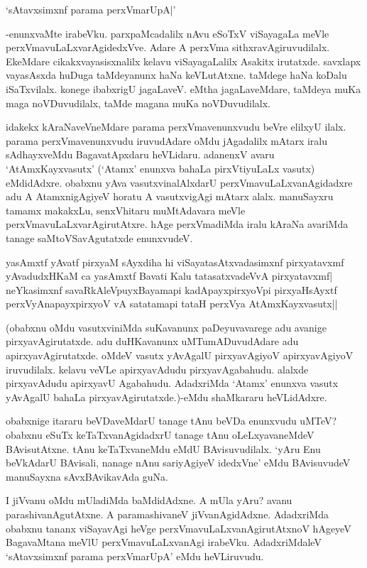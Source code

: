 \begin{shloka}
`sAtavxsimxnf parama perxVmarUpA|'
\end{shloka}

-enunxvaMte irabeVku. parxpaMcadalilx nAvu eSoTxV viSayagaLa meVle perxVmavuLaLxvarAgidedxVve. Adare A perxVma sithxravAgiruvudilalx. EkeMdare cikakxvayasisxnalilx kelavu viSayagaLalilx Asakitx irutatxde. savxlapx vayasAsxda huDuga taMdeyanunx haNa keVLutAtxne. taMdege haNa koDalu iSaTxvilalx. konege ibabxrigU jagaLaveV. eMtha jagaLaveMdare, taMdeya muKa maga noVDuvudilalx, taMde magana muKa noVDuvudilalx.

idakekx kAraNaveVneMdare parama perxVmavenunxvudu beVre elilxyU ilalx. parama perxVmavenunxvudu iruvudAdare oMdu jAgadalilx mAtarx iralu sAdhayxveMdu BagavatApxdaru heVLidaru. adanenxV avaru `AtAmxKayxvasutx' (`Atamx' enunxva bahaLa pirxVtiyuLaLx vasutx) eMdidAdxre. obabxnu yAva vasutxvinalAlxdarU perxVmavuLaLxvanAgidadxre adu A AtamxnigAgiyeV horatu A vasutxvigAgi mAtarx alalx. manuSayxru tamamx makakxLu, senxVhitaru muMtAdavara meVle perxVmavuLaLxvarAgirutAtxre. hAge perxVmadiMda iralu kAraNa avariMda tanage saMtoVSavAgutatxde enunxvudeV.

\begin{shloka}
yasAmxtf yAvatf pirxyaM sAyxdiha hi viSayatasAtxvadasimxnf pirxyatavxmf\\
yAvadudxHKaM ca yasAmxtf Bavati Kalu tatasatxvadeVvA pirxyatavxmf|\\
neYkasimxnf savaRkAleV\s puyxBayamapi kadA\s payxpirxyoV\s pi pirxyaHsAyxtf\\
perxVyAnapayxpirxyoV vA satatamapi tataH perxVya AtAmxKayxvasutx||
\end{shloka}

(obabxnu oMdu vasutxviniMda suKavanunx paDeyuvavarege adu avanige pirxyavAgirutatxde. adu duHKavanunx uMTumADuvudAdare adu apirxyavAgirutatxde. oMdeV vasutx yAvAgalU pirxyavAgiyoV apirxyavAgiyoV iruvudilalx. kelavu veVLe apirxyavAdudu pirxyavAgabahudu. alalxde pirxyavAdudu apirxyavU Agabahudu. AdadxriMda `Atamx' enunxva vasutx yAvAgalU bahaLa pirxyavAgirutatxde.)-eMdu shaMkararu heVLidAdxre.

obabxnige itararu beVDaveMdarU tanage tAnu beVDa enunxvudu uMTeV? obabxnu eSuTx keTaTxvanAgidadxrU tanage tAnu oLeLxyavaneMdeV BAvisutAtxne. tAnu keTaTxvaneMdu eMdU BAvisuvudilalx. `yAru Enu beVkAdarU BAvisali, nanage nAnu sariyAgiyeV idedxVne' eMdu BAvisuvudeV manuSayxna sAvxBAvikavAda guNa.

I jiVvanu oMdu mUladiMda baMdidAdxne. A mUla yAru? avanu parashivanAgutAtxne. A paramashivaneV jiVvanAgidAdxne. AdadxriMda obabxnu tananx viSayavAgi heVge perxVmavuLaLxvanAgirutAtxnoV hAgeyeV BagavaMtana meVlU perxVmavuLaLxvanAgi irabeVku. AdadxriMdaleV `sAtavxsimxnf parama perxVmarUpA' eMdu heVLiruvudu.

